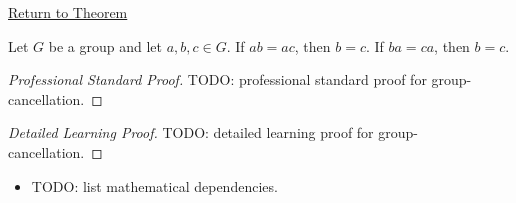 \newpage
{}
\label{prf:group-cancellation}

\begin{remark*}[Return]
\hyperref[prop:group-cancellation]{Return to Theorem}
\end{remark*}

\begin{proposition*}
Let $G$ be a group and let $a,b,c \in G$.
If $ab = ac$, then $b=c$.
If $ba = ca$, then $b=c$.
\end{proposition*}

\begin{proof}[Professional Standard Proof]
\LRAProofBodyStart
TODO: professional standard proof for group-cancellation.
\end{proof}

\begin{proof}[Detailed Learning Proof]
\LRAProofBodyStart
TODO: detailed learning proof for group-cancellation.
\end{proof}

\begin{remark*}
\end{remark*}

\begin{dependencies}
\begin{itemize}
  \item TODO: list mathematical dependencies.
\end{itemize}
\end{dependencies}

\clearpage
